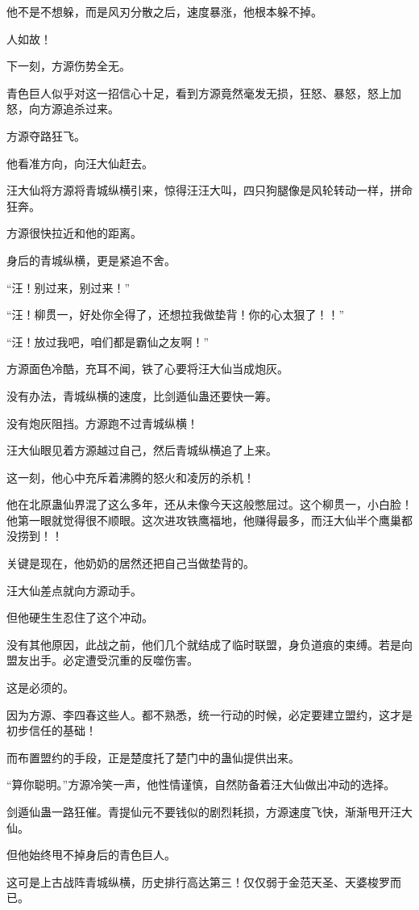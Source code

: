 \begin{this_body}
他不是不想躲，而是风刃分散之后，速度暴涨，他根本躲不掉。

人如故！

下一刻，方源伤势全无。

青色巨人似乎对这一招信心十足，看到方源竟然毫发无损，狂怒、暴怒，怒上加怒，向方源追杀过来。

方源夺路狂飞。

他看准方向，向汪大仙赶去。

汪大仙将方源将青城纵横引来，惊得汪汪大叫，四只狗腿像是风轮转动一样，拼命狂奔。

方源很快拉近和他的距离。

身后的青城纵横，更是紧追不舍。

“汪！别过来，别过来！”

“汪！柳贯一，好处你全得了，还想拉我做垫背！你的心太狠了！！”

“汪！放过我吧，咱们都是霸仙之友啊！”

方源面色冷酷，充耳不闻，铁了心要将汪大仙当成炮灰。

没有办法，青城纵横的速度，比剑遁仙蛊还要快一筹。

没有炮灰阻挡。方源跑不过青城纵横！

汪大仙眼见着方源越过自己，然后青城纵横追了上来。

这一刻，他心中充斥着沸腾的怒火和凌厉的杀机！

他在北原蛊仙界混了这么多年，还从未像今天这般憋屈过。这个柳贯一，小白脸！他第一眼就觉得很不顺眼。这次进攻铁鹰福地，他赚得最多，而汪大仙半个鹰巢都没捞到！！

关键是现在，他奶奶的居然还把自己当做垫背的。

汪大仙差点就向方源动手。

但他硬生生忍住了这个冲动。

没有其他原因，此战之前，他们几个就结成了临时联盟，身负道痕的束缚。若是向盟友出手。必定遭受沉重的反噬伤害。

这是必须的。

因为方源、李四春这些人。都不熟悉，统一行动的时候，必定要建立盟约，这才是初步信任的基础！

而布置盟约的手段，正是楚度托了楚门中的蛊仙提供出来。

“算你聪明。”方源冷笑一声，他性情谨慎，自然防备着汪大仙做出冲动的选择。

剑遁仙蛊一路狂催。青提仙元不要钱似的剧烈耗损，方源速度飞快，渐渐甩开汪大仙。

但他始终甩不掉身后的青色巨人。

这可是上古战阵青城纵横，历史排行高达第三！仅仅弱于金范天圣、天婆梭罗而已。


\end{this_body}
